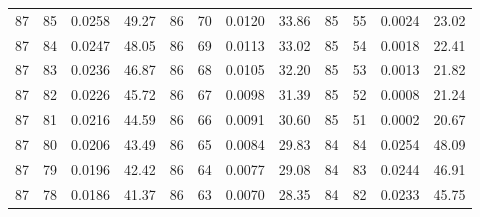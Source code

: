 \begin{tabular}{llll|llll|llll}
87 & 85 & 0.0258 & 49.27 & 86 & 70 & 0.0120 & 33.86 & 85 & 55 & 0.0024 & 23.02\\
87 & 84 & 0.0247 & 48.05 & 86 & 69 & 0.0113 & 33.02 & 85 & 54 & 0.0018 & 22.41\\
87 & 83 & 0.0236 & 46.87 & 86 & 68 & 0.0105 & 32.20 & 85 & 53 & 0.0013 & 21.82\\
87 & 82 & 0.0226 & 45.72 & 86 & 67 & 0.0098 & 31.39 & 85 & 52 & 0.0008 & 21.24\\
87 & 81 & 0.0216 & 44.59 & 86 & 66 & 0.0091 & 30.60 & 85 & 51 & 0.0002 & 20.67\\
87 & 80 & 0.0206 & 43.49 & 86 & 65 & 0.0084 & 29.83 & 84 & 84 & 0.0254 & 48.09\\
87 & 79 & 0.0196 & 42.42 & 86 & 64 & 0.0077 & 29.08 & 84 & 83 & 0.0244 & 46.91\\
87 & 78 & 0.0186 & 41.37 & 86 & 63 & 0.0070 & 28.35 & 84 & 82 & 0.0233 & 45.75\\
\bottomrule
\end{tabular}
\newpage
